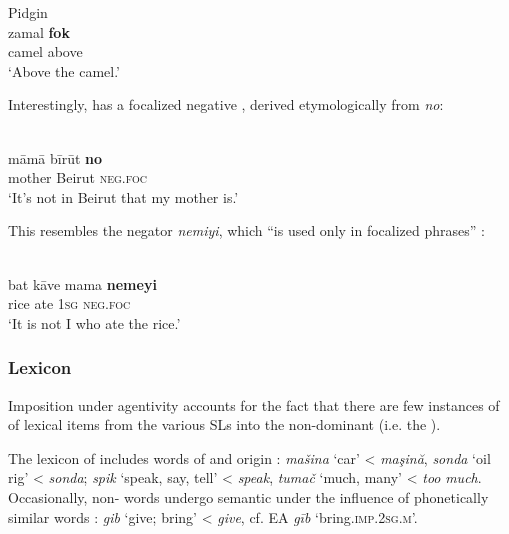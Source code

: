\documentclass[output=paper]{langsci/langscibook}
\begin{document}
\ex
{} Pidgin  \citep[25]{Avram2014Pidgin}\\
\gll     zamal \textbf{fok} \\
         camel above\\
\glt       `Above the camel.'
\z
\z

Interestingly,  has a focalized negative , derived etymologically from  \textit{no}:

\ea
{  \citep[133]{Bizri2010}}\\
\gll   māmā bīrūt \textbf{no}\\
       mother Beirut \textsc{neg}.\textsc{foc}\\
\glt     `It’s not in Beirut that my mother is.'
\z

This resembles the  negator \textit{nemiyi}, which “is used only in focalized phrases” \citep[69]{Bizri2010}:

\ea
{  \citep[69]{Bizri2010}}\\
\gll   bat kāve mama \textbf{nemeyi}\\
       rice ate 1\textsc{sg} \textsc{neg}.\textsc{foc}\\
\glt     `It is not I who ate the rice.'
\z

 \subsubsection{Lexicon}

Imposition under  agentivity accounts for the fact that there are few instances of  of lexical items from the various SLs into the non-dominant  (i.e. the ). 

The lexicon of   includes words of  and  origin \citep[32]{Avram2010}: \textit{mašina} ‘car’ <  \textit{maşină}, \textit{sonda} ‘oil rig’ <  \textit{sonda}; \textit{spik} ‘speak, say, tell’ <  \textit{speak}, \textit{tumač} ‘much, many’ <  \textit{too} \textit{much}. Occasionally, non- words undergo semantic  under the influence of phonetically similar  words \citep[32]{Avram2010}: \textit{gib} ‘give; bring’ <  \textit{give}, cf. EA \textit{gīb} ‘bring.\textsc{imp.2sg.m}’. 
\end{document}
